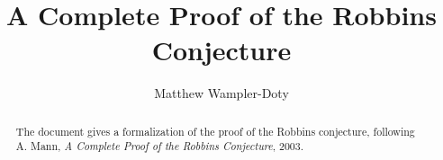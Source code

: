 \documentclass[11pt,a4paper]{article}
\begin{document}
\title{A Complete Proof of the Robbins Conjecture}
\author{Matthew Wampler-Doty}
\maketitle

\begin{abstract}
The document gives a formalization of the proof of the Robbins 
conjecture, following A. Mann, \emph{A Complete Proof of the 
Robbins Conjecture}, 2003.
\end{abstract}

\tableofcontents



%
%
\end{document}
